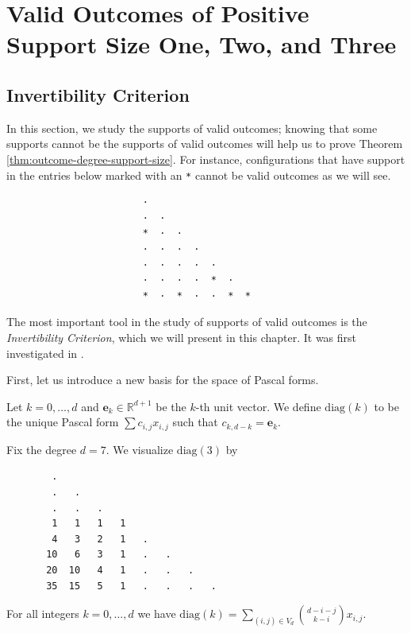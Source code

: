 \chapter{Valid Outcomes of Positive Support Size One, Two, and Three}

\section{Invertibility Criterion}

In this section, we study the supports of valid outcomes; knowing that some supports cannot be the supports of valid outcomes will help us to prove Theorem \ref{thm:outcome-degree-support-size}. For instance, configurations that have support in the entries below marked with an \texttt{*} cannot be valid outcomes as we will see.
\begin{verbatim}
                        ·  
                        ·  · 
                        *  ·  · 
                        ·  ·  ·  · 
                        ·  ·  ·  ·  · 
                        ·  ·  ·  ·  *  · 
                        *  ·  *  ·  ·  *  *
\end{verbatim}
The most important tool in the study of supports of valid outcomes is the \emph{Invertibility Criterion}, which we will present in this chapter. It was first investigated in \cite{bik2022classifying}. 

First, let us introduce a new basis for the space of Pascal forms.

\begin{definition}
    Let \( k = 0, \dots, d \) and \( \mathbf e_k \in \mathbb{R}^{d+1} \) be the \( k \)-th unit vector. We define \( \mathrm{diag}(k) \) to be the unique Pascal form \( \sum c_{i,j}x_{i,j} \) such that \( c_{k,d-k} = \mathbf e_k \).
\end{definition}

\begin{example}
    Fix the degree \( d = 7 \). We visualize \( \mathrm{diag}(3) \) by
    \begin{verbatim}
        .
        .   .
        .   .   .
        1   1   1   1
        4   3   2   1   .
       10   6   3   1   .   .
       20  10   4   1   .   .   . 
       35  15   5   1   .   .   .   .
    \end{verbatim}
\end{example}

\begin{proposition}\label{prop:diagonal-basis-324324324231}
    For all integers \( k = 0, \dots, d \) we have \( \mathrm{diag}(k)  = \sum_{(i,j) \in V_d}\binom{d - i - j}{k-i} x_{i,j} \).
\end{proposition}

